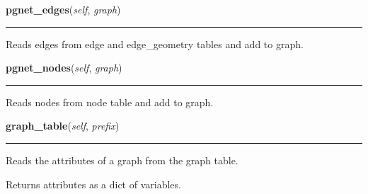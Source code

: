     \label{nx_pgnet:read:pgnet_edges}

    \vspace{0.5ex}

\hspace{.8\funcindent}\begin{boxedminipage}{\funcwidth}

    \raggedright \textbf{pgnet\_edges}(\textit{self}, \textit{graph})

    \vspace{-1.5ex}

    \rule{\textwidth}{0.5\fboxrule}
\setlength{\parskip}{2ex}
    Reads edges from edge and edge\_geometry tables and add to graph.

\setlength{\parskip}{1ex}
    \end{boxedminipage}

    \label{nx_pgnet:read:pgnet_nodes}

    \vspace{0.5ex}

\hspace{.8\funcindent}\begin{boxedminipage}{\funcwidth}

    \raggedright \textbf{pgnet\_nodes}(\textit{self}, \textit{graph})

    \vspace{-1.5ex}

    \rule{\textwidth}{0.5\fboxrule}
\setlength{\parskip}{2ex}
    Reads nodes from node table and add to graph.

\setlength{\parskip}{1ex}
    \end{boxedminipage}

    \label{nx_pgnet:read:graph_table}

    \vspace{0.5ex}

\hspace{.8\funcindent}\begin{boxedminipage}{\funcwidth}

    \raggedright \textbf{graph\_table}(\textit{self}, \textit{prefix})

    \vspace{-1.5ex}

    \rule{\textwidth}{0.5\fboxrule}
\setlength{\parskip}{2ex}
    Reads the attributes of a graph from the graph table.

    Returns attributes as a dict of variables.

\setlength{\parskip}{1ex}
    \end{boxedminipage}

